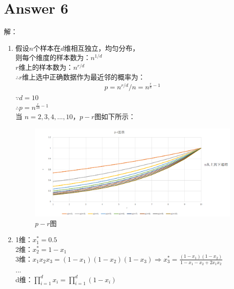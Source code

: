 \documentclass[a4paper,11pt,onecolumn,oneside,UTF8]{article}
\begin{document}
\section*{Answer 6}
解：
\begin{enumerate}
    \item
          假设$n$个样本在$d$维相互独立，均匀分布，\\
          则每个维度的样本数为：$n^{1/d}$ \\
          $r$维上的样本数为：$n^{r/d}$ \\
          $\therefore r$维上选中正确数据作为最近邻的概率为：\\
          $$\begin{aligned}p =  n^{r/d}/n = n^{\frac{r}{d}-1}\end{aligned}$$
          $\because d = 10$\\
          $\therefore p = n^{\frac{r}{10}-1}$ \\
          当 $n = 2,3,4,...,10$，$p-r$图如下所示：\\
          \begin{figure}[H]
              \centering
              \includegraphics[width=.8\textwidth]{hw2_2.png}
              \caption{ $p-r$图 }
              \label{img2}
          \end{figure}

    \item
          1维：$x_1^*=0.5$ \\
          2维：$x_2^*=1-x_1$ \\
          3维：$x_1x_2x_3 = \left(1-x_1\right)\left(1-x_2\right)\left(1-x_3\right)
              \Rightarrow x_3^* = \frac{\left(1-x_1\right)\left(1-x_2\right)}{1-x_1-x_2+2x_1x_2}$ \\
          ... \\
          d维：$\prod\limits_{i=1}^dx_i = \prod\limits_{i=1}^d\left(1-x_i\right)$
\end{enumerate}
\end{document}
